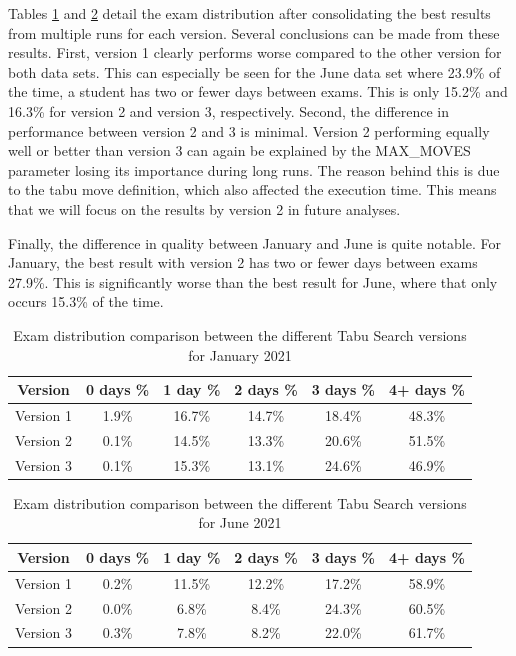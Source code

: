 Tables \ref{tab:version_comparison_sem1} and \ref{tab:version_comparison_sem2} detail the exam distribution after consolidating the best results from multiple runs for each version. Several conclusions can be made from these results. First, version 1 clearly performs worse compared to the other version for both data sets. This can especially be seen for the June data set where 23.9\% of the time, a student has two or fewer days between exams. This is only 15.2\% and 16.3\% for version 2 and version 3, respectively. Second, the difference in performance between version 2 and 3 is minimal. Version 2 performing equally well or better than version 3 can again be explained by the MAX\_MOVES parameter losing its importance during long runs. The reason behind this is due to the tabu move definition, which also affected the execution time. This means that we will focus on the results by version 2 in future analyses.

Finally, the difference in quality between January and June is quite notable. For January, the best result with version 2 has two or fewer days between exams 27.9\%. This is significantly worse than the best result for June, where that only occurs 15.3\% of the time.

\begin{table}[h]
	\caption{Exam distribution comparison between the different Tabu Search versions for January 2021}
	\label{tab:version_comparison_sem1}
	\centering
	\begin{tabular}{c c c c c c}
		\hline
  	\textbf{Version}	&
   \textbf{0 days \% } &
    \textbf{1 day \% } & 
    \textbf{2 days \% } &
    \textbf{3 days \% } & 
    \textbf{4+ days \%}\\ \hline
    Version 1 & 1.9\% & 16.7\% & 14.7\% & 18.4\% & 48.3\% \\
    Version 2 & 0.1\% & 14.5\% & 13.3\% & 20.6\% & 51.5\% \\
    Version 3 & 0.1\% & 15.3\% & 13.1\% & 24.6\% & 46.9\% \\
        \hline
	\end{tabular}
\end{table}

\begin{table}[h]
	\caption{Exam distribution comparison between the different Tabu Search versions for June 2021}
	\label{tab:version_comparison_sem2}
	\centering
	\begin{tabular}{c c c c c c}
		\hline
  	\textbf{Version}	&
   \textbf{0 days \% } &
    \textbf{1 day \% } & 
    \textbf{2 days \% } &
    \textbf{3 days \% } & 
    \textbf{4+ days \%}\\ \hline
    Version 1 & 0.2\% & 11.5\% & 12.2\% & 17.2\% & 58.9\% \\
    Version 2 & 0.0\% & 6.8\% & 8.4\% & 24.3\% & 60.5\% \\
    Version 3 & 0.3\% & 7.8\% & 8.2\% & 22.0\% & 61.7\% \\
        \hline
	\end{tabular}
\end{table}
 \label{subsec:versions}
